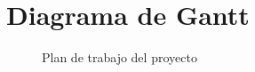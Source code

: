 \section{Diagrama de Gantt}

\begin{figure}[htbp!]
	\begin{center}
		\caption{Plan de trabajo del proyecto}
		\label{fig:plan}
	\end{center}
\end{figure}

